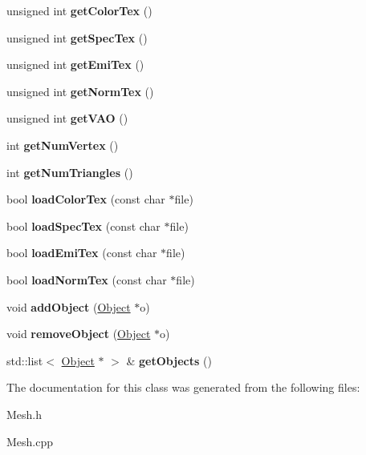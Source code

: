 \begin{DoxyCompactItemize}
unsigned int {\bfseries get\+Color\+Tex} ()
\item 
\mbox{\label{class_mesh_ad4787ea15b5ad63eed00a1a0ef272637}} 
unsigned int {\bfseries get\+Spec\+Tex} ()
\item 
\mbox{\label{class_mesh_ad0b8c57f20a5319e2e730cfa61271904}} 
unsigned int {\bfseries get\+Emi\+Tex} ()
\item 
\mbox{\label{class_mesh_a8b60518f329c4e3d15824ef68c794fa1}} 
unsigned int {\bfseries get\+Norm\+Tex} ()
\item 
\mbox{\label{class_mesh_add2e2bafe60711ec9f67308c140640a9}} 
unsigned int {\bfseries get\+V\+AO} ()
\item 
\mbox{\label{class_mesh_ae4163571bceed9d224fc43e943dda118}} 
int {\bfseries get\+Num\+Vertex} ()
\item 
\mbox{\label{class_mesh_a4452aed4ac63ff0639b839bba095347e}} 
int {\bfseries get\+Num\+Triangles} ()
\item 
\mbox{\label{class_mesh_ac06b928f547c1eec3b66ae5503608c21}} 
bool {\bfseries load\+Color\+Tex} (const char $\ast$file)
\item 
\mbox{\label{class_mesh_ada437d0826057661de46ab5ce2b497a4}} 
bool {\bfseries load\+Spec\+Tex} (const char $\ast$file)
\item 
\mbox{\label{class_mesh_abb21ce55711b89f7018d103b50294f69}} 
bool {\bfseries load\+Emi\+Tex} (const char $\ast$file)
\item 
\mbox{\label{class_mesh_a443b1a0a0c36ff911f58f2a5f4616538}} 
bool {\bfseries load\+Norm\+Tex} (const char $\ast$file)
\item 
\mbox{\label{class_mesh_a81e2edec37429d2830a551d07476c7ba}} 
void {\bfseries add\+Object} (\hyperlink{class_object}{Object} $\ast$o)
\item 
\mbox{\label{class_mesh_a7c209ba6e5596edaeb9062cf23d3532b}} 
void {\bfseries remove\+Object} (\hyperlink{class_object}{Object} $\ast$o)
\item 
\mbox{\label{class_mesh_aadc3cc59b0dccf99961105431a717579}} 
std\+::list$<$ \hyperlink{class_object}{Object} $\ast$ $>$ \& {\bfseries get\+Objects} ()
\end{DoxyCompactItemize}


The documentation for this class was generated from the following files\+:\begin{DoxyCompactItemize}
\item 
Mesh.\+h\item 
Mesh.\+cpp\end{DoxyCompactItemize}
